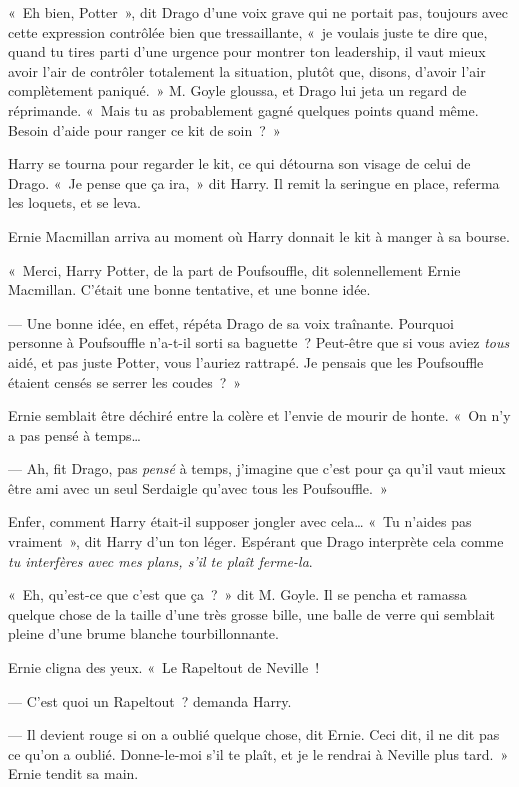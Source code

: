 «~Eh bien, Potter~», dit Drago d'une voix grave qui ne portait pas, toujours avec cette expression contrôlée bien que tressaillante, «~je voulais juste te dire que, quand tu tires parti d'une urgence pour montrer ton leadership, il vaut mieux avoir l'air de contrôler totalement la situation, plutôt que, disons, d'avoir l'air complètement paniqué.~»
M. Goyle gloussa, et Drago lui jeta un regard de réprimande.
«~Mais tu as probablement gagné quelques points quand même.
Besoin d'aide pour ranger ce kit de soin~?~»

Harry se tourna pour regarder le kit, ce qui détourna son visage de celui de Drago.
«~Je pense que ça ira,~» dit Harry.
Il remit la seringue en place, referma les loquets, et se leva.

Ernie Macmillan arriva au moment où Harry donnait le kit à manger à sa bourse.

«~Merci, Harry Potter, de la part de Poufsouffle, dit solennellement Ernie Macmillan.
C'était une bonne tentative, et une bonne idée.

--- Une bonne idée, en effet, répéta Drago de sa voix traînante.
Pourquoi personne à Poufsouffle n'a-t-il sorti sa baguette~?
Peut-être que si vous aviez \emph{tous} aidé, et pas juste Potter, vous l'auriez rattrapé.
Je pensais que les Poufsouffle étaient censés se serrer les coudes~?~»

Ernie semblait être déchiré entre la colère et l'envie de mourir de honte.
«~On n'y a pas pensé à temps…

--- Ah, fit Drago, pas \emph{pensé} à temps, j'imagine que c'est pour ça qu'il vaut mieux être ami avec un seul Serdaigle qu'avec tous les Poufsouffle.~»

Enfer, comment Harry était-il supposer jongler avec cela…
«~Tu n'aides pas vraiment~», dit Harry d'un ton léger.
Espérant que Drago interprète cela comme \emph{tu interfères avec mes plans, s'il te plaît ferme-la}.

«~Eh, qu'est-ce que c'est que ça~?~» dit M. Goyle.
Il se pencha et ramassa quelque chose de la taille d'une très grosse bille, une balle de verre qui semblait pleine d'une brume blanche tourbillonnante.

Ernie cligna des yeux.
«~Le Rapeltout de Neville~!

--- C'est quoi un Rapeltout~? demanda Harry.

--- Il devient rouge si on a oublié quelque chose, dit Ernie.
Ceci dit, il ne dit pas ce qu'on a oublié.
Donne-le-moi s'il te plaît, et je le rendrai à Neville plus tard.~»
Ernie tendit sa main.

